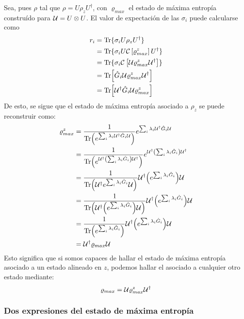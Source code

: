 Sea, pues $\rho$ tal que $\rho=U\rho_{z}U^{\dag}$, con $\varrho_{max}$ el estado de máxima entropía construído para  $\mathcal{U}=U\otimes U$. El valor de expectación de las $\sigma_{i}$ puede calcularse como
\begin{align*}
    r_{i}&=\Tr\{\sigma_{i}U\rho_{z}U^{\dag}\}\\
    &=\Tr\{\sigma_{i}U\mathcal{C}\left[\varrho_{max}^{z}\right]U^{\dag}\}\\
    &=\Tr\{\sigma_{i}\mathcal{C}\left[\mathcal{U}\varrho_{max}^{z}\mathcal{U}^{\dag}\right]\}\\
    &=\Tr[\hat{G}_{i}\mathcal{U}\varrho_{max}^{z}\mathcal{U}^{\dag}]\\
    &=\Tr[\mathcal{U}^{\dag}\hat{G}_{i}\mathcal{U}\varrho_{max}^{z}]\\
    \end{align*}
De esto, se sigue que el estado de máxima entropía asociado a $\rho_{z}$ se puede reconstruir como:
\begin{align*}
\varrho_{max}^{z}&=\frac{1}{\Tr(e^{\sum_{i}\lambda_{i}\mathcal{U}^{\dag}\hat{G}_{i}\mathcal{U}})}e^{\sum_{i}\lambda_{i}\mathcal{U}^{\dag}\hat{G}_{i}\mathcal{U}}\\
&=\frac{1}{\Tr(e^{\mathcal{U}^{\dag}\qty(\sum_{i}\lambda_{i}\hat{G}_{i})\mathcal{U}^{\dag}})}e^{\mathcal{U}^{\dag}\qty(\sum_{i}\lambda_{i}\hat{G}_{i})\mathcal{U}^{\dag}}\\
&=\frac{1}{\Tr(\mathcal{U}^{\dag}e^{\sum_{i}\lambda_{i}\hat{G}_{i}}\mathcal{U})}\mathcal{U}^{\dag}\qty(e^{\sum_{i}\lambda_{i}\hat{G}_{i}})\mathcal{U}\\
&=\frac{1}{\Tr(\mathcal{U}^{\dag}\qty(e^{\sum_{i}\lambda_{i}\hat{G}_{i}})\mathcal{U})}\mathcal{U}^{\dag}\qty(e^{\sum_{i}\lambda_{i}\hat{G}_{i}})\mathcal{U}\\
&=\frac{1}{\Tr(e^{\sum_{i}\lambda_{i}\hat{G}_{i}})}\mathcal{U}^{\dag}\qty(e^{\sum_{i}\lambda_{i}\hat{G}_{i}})\mathcal{U}\\
&=\mathcal{U}^{\dag}\varrho_{max}\mathcal{U}
\end{align*}
Esto significa que si somos capaces de hallar el estado de máxima entropía asociado a un estado alineado en $z$, podemos hallar el asociado a cualquier otro estado mediante:
\begin{equation}
\varrho_{max}=\mathcal{U}\varrho_{max}^{z}\mathcal{U}^{\dag}
\end{equation}


\subsubsection{Dos expresiones del estado de máxima entropía}

